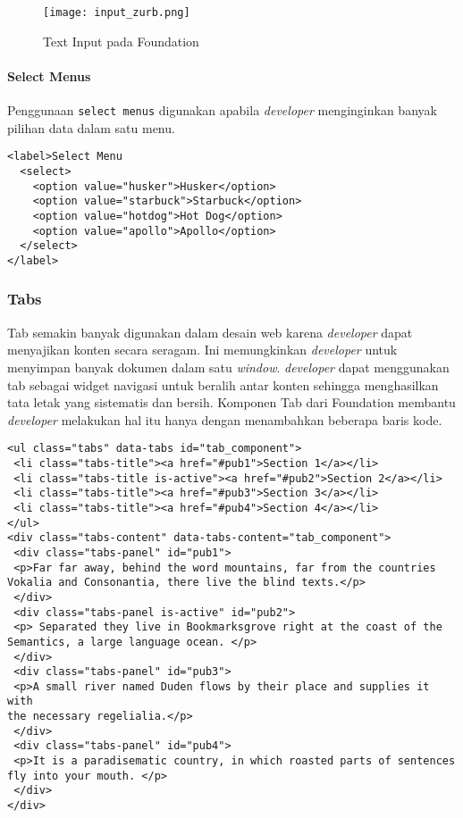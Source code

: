 \begin{figure} [H]
	\centering  
	\texttt{[image: input\_zurb.png]}  
	\caption{Text Input pada Foundation}
	\label{fig:gridbasic_zurb} 
\end{figure}

\paragraph{Select Menus}
Penggunaan \texttt{select menus} digunakan apabila \textit{developer} menginginkan banyak pilihan data dalam satu menu.
\begin{lstlisting}[frame=single] 
<label>Select Menu
  <select>
    <option value="husker">Husker</option>
    <option value="starbuck">Starbuck</option>
    <option value="hotdog">Hot Dog</option>
    <option value="apollo">Apollo</option>
  </select>
</label>
\end{lstlisting}


\subsubsection{Tabs}
Tab semakin banyak digunakan dalam desain web karena \textit{developer} dapat menyajikan konten secara seragam. Ini memungkinkan \textit{developer} untuk menyimpan banyak dokumen dalam satu \textit{window}. \textit{developer} dapat menggunakan tab sebagai widget navigasi untuk beralih antar konten sehingga menghasilkan tata letak yang sistematis dan bersih. Komponen Tab dari Foundation membantu \textit{developer} melakukan hal itu hanya dengan menambahkan beberapa baris kode. 

\begin{lstlisting}[frame=single] 
<ul class="tabs" data-tabs id="tab_component">
 <li class="tabs-title"><a href="#pub1">Section 1</a></li>
 <li class="tabs-title is-active"><a href="#pub2">Section 2</a></li>
 <li class="tabs-title"><a href="#pub3">Section 3</a></li>
 <li class="tabs-title"><a href="#pub4">Section 4</a></li>
</ul>
<div class="tabs-content" data-tabs-content="tab_component">
 <div class="tabs-panel" id="pub1">
 <p>Far far away, behind the word mountains, far from the countries
Vokalia and Consonantia, there live the blind texts.</p>
 </div>
 <div class="tabs-panel is-active" id="pub2">
 <p> Separated they live in Bookmarksgrove right at the coast of the
Semantics, a large language ocean. </p>
 </div>
 <div class="tabs-panel" id="pub3">
 <p>A small river named Duden flows by their place and supplies it with
the necessary regelialia.</p>
 </div>
 <div class="tabs-panel" id="pub4">
 <p>It is a paradisematic country, in which roasted parts of sentences
fly into your mouth. </p>
 </div>
</div>
\end{lstlisting}

